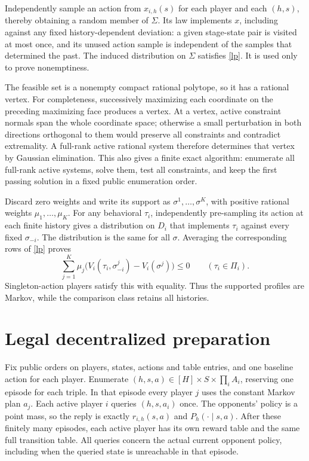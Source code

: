 \documentclass[11pt]{article}
\begin{document}
Independently sample an action from $x_{i,h}(s)$ for each player and
each $(h,s)$, thereby obtaining a random member of $\Sigma$.
Its law implements $x$, including against any fixed history-dependent
deviation: a given stage-state pair is visited at most once, and its
unused action sample is independent of the samples that determined
the past. The induced distribution on $\Sigma$ satisfies
\eqref{lp}. It is used only to prove nonemptiness.

The feasible set is a nonempty compact rational polytope, so it has a
rational vertex. For completeness, successively maximizing each
coordinate on the preceding maximizing face produces a vertex.
At a vertex, active constraint normals span the whole coordinate space;
otherwise a small perturbation in both directions orthogonal to them
would preserve all constraints and contradict extremality. A full-rank
active rational system therefore determines that vertex by Gaussian
elimination. This also gives a finite exact algorithm: enumerate all
full-rank active systems, solve them, test all constraints, and keep the
first passing solution in a fixed public enumeration order.

Discard zero weights and write its support as
$\sigma^1,\ldots,\sigma^K$, with positive rational weights
$\mu_1,\ldots,\mu_K$. For any behavioral $\tau_i$, independently
pre-sampling its action at each finite history gives a distribution on
$D_i$ that implements $\tau_i$ against every fixed $\sigma_{-i}$.
The distribution is the same for all $\sigma$. Averaging the corresponding
rows of \eqref{lp} proves
\begin{equation}\label{allpolicies}
 \sum_{j=1}^K\mu_j
       \bigl(V_i(\tau_i,\sigma^j_{-i})-V_i(\sigma^j)\bigr)\leq0
       \qquad(\tau_i\in\Pi_i).
\end{equation}
Singleton-action players satisfy this with equality. Thus the supported
profiles are Markov, while the comparison class retains all histories.

\section{Legal decentralized preparation}
Fix public orders on players, states, actions and table entries, and
one baseline action for each player. Enumerate $(h,s,a)\in[H]\times
S\times\prod_iA_i$, reserving one episode for each triple.
In that episode every player $j$ uses the constant Markov plan $a_j$.
Each active player $i$ queries $(h,s,a_i)$ once. The opponents' policy
is a point mass, so the reply is exactly $r_{i,h}(s,a)$ and
$P_h(\cdot\mid s,a)$. After these finitely many episodes, each active
player has its own reward table and the same full transition table.
All queries concern the actual current opponent policy, including when
the queried state is unreachable in that episode.
\end{document}
